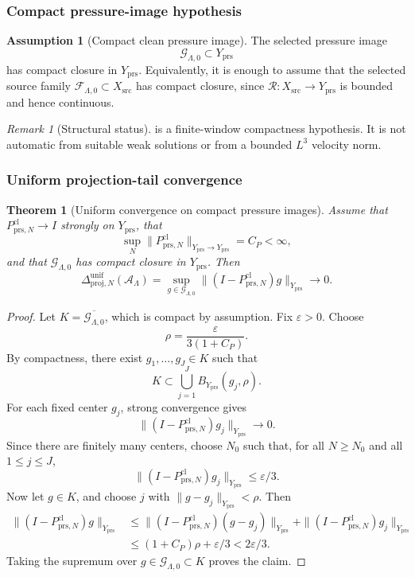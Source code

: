 \documentclass[11pt]{article}
\numberwithin{equation}{section}
\newtheorem{theorem}{Theorem}[section]
\theoremstyle{definition}
\newtheorem{assumption}[assumption]{Assumption}
\theoremstyle{remark}
\newtheorem{remark}[remark]{Remark}
\newcommand{\prs}{\mathrm{prs}}
\newcommand{\proj}{\mathrm{proj}}
\newcommand{\src}{\mathrm{src}}
\newcommand{\cl}{\mathrm{cl}}
\begin{document}
\subsubsection{Compact pressure-image hypothesis}

\begin{assumption}[Compact clean pressure image]
\label{ass:compact-clean-pressure-image}
The selected pressure image
\[
    \mathcal G_{\Lambda,0}\subset Y_{\prs}
\]
has compact closure in \(Y_{\prs}\).  Equivalently, it is enough to assume that
the selected source family \(\mathcal F_{\Lambda,0}\subset X_{\src}\) has compact
closure, since \(\mathcal R:X_{\src}\to Y_{\prs}\) is bounded and hence continuous.
\end{assumption}

\begin{remark}[Structural status]
 is a finite-window compactness
hypothesis.  It is not automatic from suitable weak solutions or from a
bounded \(L^3\) velocity norm.
\end{remark}

\subsubsection{Uniform projection-tail convergence}

\begin{theorem}[Uniform convergence on compact pressure images]
\label{thm:uniform-projection-tail-compact-image}
Assume that \(P^{\cl}_{\prs,N}\to I\) strongly on \(Y_{\prs}\), that
\[
    \sup_N\|P^{\cl}_{\prs,N}\|_{Y_{\prs}\to Y_{\prs}}=C_P<\infty,
\]
and that \(\mathcal G_{\Lambda,0}\) has compact closure in \(Y_{\prs}\).  Then
\[
    \Delta^{\mathrm{unif}}_{\proj,N}(\mathcal A_\Lambda)
    =
    \sup_{g\in\mathcal G_{\Lambda,0}}
    \|(I-P^{\cl}_{\prs,N})g\|_{Y_{\prs}}
    \to 0.
\]
\end{theorem}

\begin{proof}
Let \(K=\overline{\mathcal G_{\Lambda,0}}\), which is compact by assumption.
Fix \(\varepsilon>0\).  Choose
\[
    \rho=\frac{\varepsilon}{3(1+C_P)}.
\]
By compactness, there exist \(g_1,\ldots,g_J\in K\) such that
\[
    K\subset \bigcup_{j=1}^J B_{Y_{\prs}}(g_j,\rho).
\]
For each fixed center \(g_j\), strong convergence gives
\[
    \|(I-P^{\cl}_{\prs,N})g_j\|_{Y_{\prs}}\to0.
\]
Since there are finitely many centers, choose \(N_0\) such that, for all
\(N\ge N_0\) and all \(1\le j\le J\),
\[
    \|(I-P^{\cl}_{\prs,N})g_j\|_{Y_{\prs}}\le \varepsilon/3.
\]
Now let \(g\in K\), and choose \(j\) with \(\|g-g_j\|_{Y_{\prs}}<\rho\).  Then
\[
\begin{aligned}
    \|(I-P^{\cl}_{\prs,N})g\|_{Y_{\prs}}
    &\le
    \|(I-P^{\cl}_{\prs,N})(g-g_j)\|_{Y_{\prs}}
    +
    \|(I-P^{\cl}_{\prs,N})g_j\|_{Y_{\prs}}
\\
    &\le
    (1+C_P)\rho+\varepsilon/3
    <
    2\varepsilon/3.
\end{aligned}
\]
Taking the supremum over \(g\in\mathcal G_{\Lambda,0}\subset K\) proves the
claim.
\end{proof}
\end{document}
